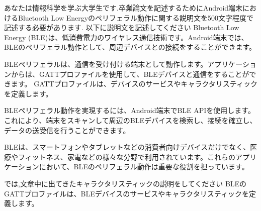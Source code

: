 



あなたは情報科学を学ぶ大学生です.卒業論文を記述するためにAndroid端末におけるBluetooth Low Energyのペリフェラル動作に関する説明文を500文字程度で記述する必要があります.
以下に説明文を記述してください
Bluetooth Low Energy (BLE)は、低消費電力のワイヤレス通信技術です。Android端末では、BLEのペリフェラル動作として、周辺デバイスとの接続をすることができます。

BLEペリフェラルは、通信を受け付ける端末として動作します。アプリケーションからは、GATTプロファイルを使用して、BLEデバイスと通信をすることができます。 GATTプロファイルは、デバイスのサービスやキャラクタリスティックを定義します。

BLEペリフェラル動作を実現するには、Android端末でBLE APIを使用します。これにより、端末をスキャンして周辺のBLEデバイスを検索し、接続を確立し、データの送受信を行うことができます。

BLEは、スマートフォンやタブレットなどの消費者向けデバイスだけでなく、医療やフィットネス、家電などの様々な分野で利用されています。これらのアプリケーションにおいて、BLEのペリフェラル動作は重要な役割を担っています。





では,文章中に出てきたキャラクタリスティックの説明をしてください
BLEのGATTプロファイルは、BLEデバイスのサービスやキャラクタリスティックを定義します。

